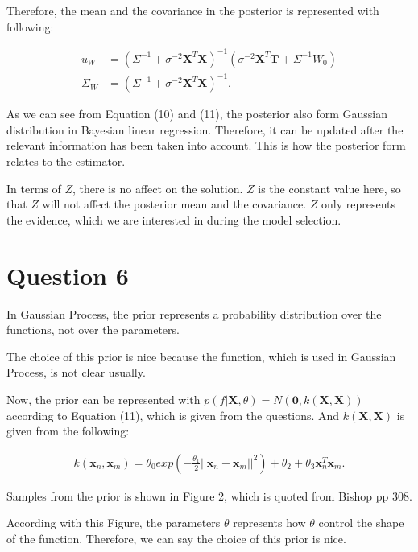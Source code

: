 \documentclass[12pt,letterpaper]{article}
\begin{document}
Therefore, the mean and the covariance in the posterior is represented with following:

\begin{equation}
\begin{split}
u_W& = (\Sigma^{-1} + \sigma^{-2}\textbf{X}^T\textbf{X})^{-1}
(\sigma^{-2}\textbf{X}^T\textbf{T} + \Sigma^{-1}W_0)\\
\Sigma_{W}& = (\Sigma^{-1} + \sigma^{-2}\textbf{X}^T\textbf{X})^{-1}.
\end{split}
\end{equation}

As we can see from Equation (10) and (11),
the posterior also form Gaussian distribution in Bayesian linear regression.
Therefore, it can be updated after the relevant information has been taken into account.
This is how the posterior form relates to the estimator.

In terms of $Z$,
there is no affect on the solution.
$Z$ is the constant value here,
so that $Z$ will not affect the posterior mean and the covariance.
$Z$ only represents the evidence, which we are interested in during the model selection.

\section*{Question 6}
In Gaussian Process,
the prior represents a probability distribution over the functions,
not over the parameters.

The choice of this prior is nice
because the function, which is used in Gaussian Process, is not clear usually.

Now, the prior can be represented with $p(f |\textbf{X}, \theta) = N (\textbf{0}, k(\textbf{X}, \textbf{X}))$ according to Equation (11), which is given from the questions.
And $k(\textbf{X}, \textbf{X})$ is given from the following:

\begin{equation}
\begin{split}
k(\textbf{x}_n, \textbf{x}_m) = 
\theta_0 exp(-\frac{\theta_1}{2}||\textbf{x}_n - \textbf{x}_m||^2)
+\theta_2 + \theta_3 \textbf{x}_n^T \textbf{x}_m.
\end{split}
\end{equation}

Samples from the prior is shown in Figure 2, which is quoted from Bishop pp 308.

According with this Figure, the parameters $\theta$ represents how $\theta$ control the shape of the function.
Therefore, we can say the choice of this prior is nice.
\end{document}
